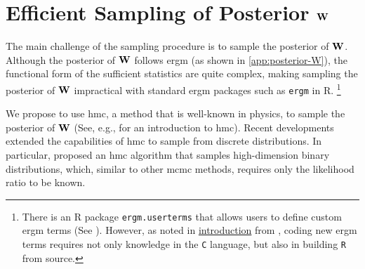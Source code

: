 \documentclass[a4paper]{article}
\begin{document}


\section{Efficient Sampling of Posterior \texorpdfstring{$\mathbf{W}$}{W}}\label{app:hmc}

The main challenge of the sampling procedure is to sample the posterior of $\mathbf{W}$.
Although the posterior of $\mathbf{W}$ follows \gls{ergm} (as shown in \autoref{app:posterior-W}),
the functional form of the sufficient statistics are quite complex,
making sampling the posterior of $\mathbf{W}$ impractical
with standard \gls{ergm} packages such as \Verb"ergm" \parencite{ergm} in R.
\footnote{\label{foot:ergm.userterms}
	There is an R package \Verb"ergm.userterms"
	that allows users to define custom \gls{ergm} terms (See \cite{ergm.userterms}).
	However, as noted in
	\href{https://cran.r-project.org/web/packages/ergm/vignettes/ergm.pdf}{introduction} from \cite{ergm},
	coding new \gls{ergm} terms requires not only knowledge in the \Verb"C" language,
	but also in building \Verb"R" from source.
}

We propose to use \gls{hmc},
a method that is well-known in physics,
to sample the posterior of $\mathbf{W}$ (See, e.g., \cite{neal-2011} for an introduction to \gls{hmc}).
Recent developments extended the capabilities of \gls{hmc} to sample from discrete distributions.
In particular, \cite{pakman-paninski-2015} proposed an \gls{hmc} algorithm
that samples high-dimension binary distributions,
which, similar to other \gls{mcmc} methods, requires only the likelihood ratio to be known.
\end{document}
